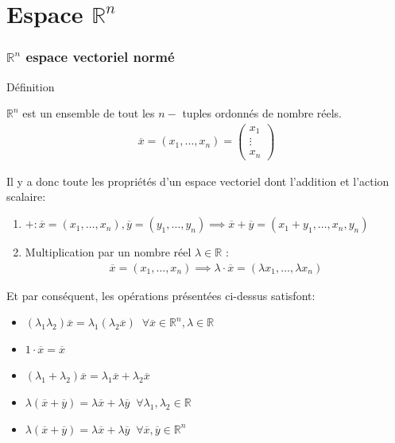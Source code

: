 \chapter{ Espace $ \mathbb{R}^n $}

\subsection{ $ \mathbb{R}^n$ espace vectoriel normé}
\begin{parag}{Définition}
    \begin{definition}
        $ \mathbb{R}^n$ est un ensemble de tout les $n-$ tuples ordonnés de nombre réels.
        \begin{align*}
            \overline{x} = (x_1, \dots, x_n) = \begin{pmatrix}
                x_1 \\
                \vdots \\ x_n
            \end{pmatrix}
        \end{align*}
        
    \end{definition}
Il y a donc toute les propriétés d'un espace vectoriel dont l'addition et l'action scalaire:
\begin{enumerate}
    \item $+ : \overline{x} = (x_1, \dots, x_n), \overline{y} = (y_1, \dots, y_n) \implies \overline{x} + \overline{y} = (x_1 + y_1, \dots, x_n, y_n)$
    \item Multiplication par un nombre réel $ \lambda \in \mathbb{R}$ :
        \begin{align*}
            \overline{x} = (x_1, \dots, x_n) \implies \lambda \cdot \overline{x} = ( \lambda x_1, \dots, \lambda x_n)
        \end{align*}
\end{enumerate}
Et par conséquent, les opérations présentées ci-dessus satisfont:
\begin{itemize}
    \item $( \lambda_1 \lambda_2) \overline{x} = \lambda_1( \lambda_2 \overline{x}) \; \; \forall \overline{x} \in \mathbb{R}^n, \lambda \in \mathbb{R}$
    \item  $ 1 \cdot \overline{x} = \overline{x}$
    \item $( \lambda_1 + \lambda_2) \overline{x} = \lambda_1 \overline{x} + \lambda_2 \overline{x}$
    \item $ \lambda( \overline{x} + \overline{y}) = \lambda \overline{x} + \lambda \overline{y}\; \;  \forall \lambda_1, \lambda_2 \in \mathbb{R}$
    \item $ \lambda ( \overline{x}+ \overline{y}) = \lambda \overline{x} + \lambda \overline{y}\; \; \forall \overline{x}, \overline{y} \in \mathbb{R}^n$
\end{itemize}

\end{parag}

